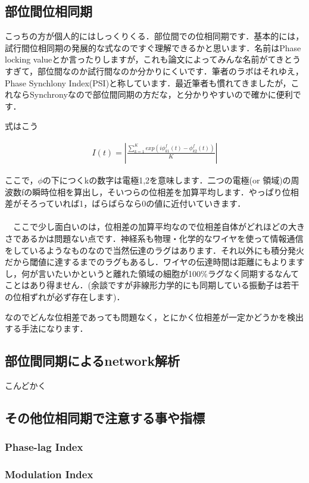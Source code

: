\documentclass[11pt,a4paper]{ujreport} 	%
\begin{document}
\subsection{部位間位相同期}
こっちの方が個人的にはしっくりくる．部位間での位相同期です．基本的には，試行間位相同期の発展的な式なのですぐ理解できるかと思います．名前はPhase locking valueとか言ったりしますが，これも論文によってみんな名前がてきとうすぎて，部位間なのか試行間なのか分かりにくいです．筆者のラボはそれゆえ，Phase Synchlony Index(PSI)と称しています．最近筆者も慣れてきましたが，これならSynchronyなので部位間同期の方だな，と分かりやすいので確かに便利です．

式はこう

\begin{eqnarray}
  \label{eq:psi}
  I(t) = |\frac{\sum_{k=1}^K exp(i \phi_{k1}^f(t) -\phi_{k2}^f(t)  )}{K}|
\end{eqnarray}

ここで，$\phi$の下につくkの数字は電極1,2を意味します．二つの電極(or 領域)の周波数fの瞬時位相を算出し，そいつらの位相差を加算平均します．やっぱり位相差がそろっていれば1，ばらばらなら0の値に近付いていきます．\\
\\
　ここで少し面白いのは，位相差の加算平均なので位相差自体がどれほどの大きさであるかは問題ない点です．神経系も物理・化学的なワイヤを使って情報通信をしているようなものなので当然伝達のラグはあります．それ以外にも積分発火だから閾値に達するまでのラグもあるし．ワイヤの伝達時間は距離にもよりますし，何が言いたいかというと離れた領域の細胞が100\%ラグなく同期するなんてことはあり得ません．(余談ですが非線形力学的にも同期している振動子は若干の位相ずれが必ず存在します)．

なのでどんな位相差であっても問題なく，とにかく位相差が一定かどうかを検出する手法になります．


\subsection{部位間同期によるnetwork解析}
こんどかく

\subsection{その他位相同期で注意する事や指標}
\subsubsection{Phase-lag Index}
\subsubsection{Modulation Index}
\end{document}
